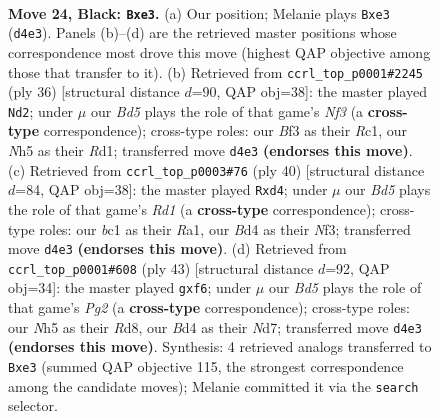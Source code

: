 \documentclass[11pt]{article}
\begin{document}
\clearpage

\begin{figure}[p]\centering
\begin{subfigure}{0.46\textwidth}\centering
\resizebox{\linewidth}{!}{%
\newchessgame
\chessboard[
  setfen={1r3r2/pp4k1/6pp/2pB3n/3bpP1P/N3RbP1/PP1P4/1RB2K2 b - - 2 24},
  showmover=false,
  pgfstyle=straightmove, color=movearrow, markmove={d4-e3}
]}
\caption{}
\end{subfigure}\hfill
\begin{subfigure}{0.46\textwidth}\centering
\resizebox{\linewidth}{!}{%
\newchessgame
\chessboard[
  setfen={5rk1/1p2bpp1/p2p1n1p/4p3/2r1P3/2P1BN2/PP3PPP/2RR2K1 w - - 0 19},
  showmover=false,
  pgfstyle=straightmove, color=movearrow, markmove={f3-d2}
]}
\caption{}
\end{subfigure}
\\[4pt]
\begin{subfigure}{0.46\textwidth}\centering
\resizebox{\linewidth}{!}{%
\newchessgame
\chessboard[
  setfen={4r1k1/1b1nb1p1/p3pr1p/8/Pp1p4/1B2BN2/1P3PPP/R2R2K1 w - - 0 21},
  showmover=false,
  pgfstyle=straightmove, color=movearrow, markmove={d1-d4}
]}
\caption{}
\end{subfigure}\hfill
\begin{subfigure}{0.46\textwidth}\centering
\resizebox{\linewidth}{!}{%
\newchessgame
\chessboard[
  setfen={3r2k1/p2nb1pp/2r1pPb1/P1p5/2N1P3/1pP1B1PB/5P1P/2RR2K1 b - - 0 22},
  showmover=false,
  pgfstyle=straightmove, color=movearrow, markmove={g7-f6}
]}
\caption{}
\end{subfigure}
\caption{\textbf{Move 24, Black: \texttt{Bxe3}.} (a) Our position; Melanie plays \texttt{Bxe3} (\texttt{d4e3}). Panels (b)--(d) are the retrieved master positions whose correspondence most drove this move (highest QAP objective among those that transfer to it). (b) Retrieved from \texttt{ccrl\_top\_p0001\#2245} (ply 36) [structural distance $d$=90, QAP obj=38]: the master played \texttt{Nd2}; under $\mu$ our \emph{Bd5} plays the role of that game's \emph{Nf3} (a \textbf{cross-type} correspondence); cross-type roles: our \emph{B}f3 as their \emph{R}c1, our \emph{N}h5 as their \emph{R}d1; transferred move \texttt{d4e3} \textbf{(endorses this move)}. (c) Retrieved from \texttt{ccrl\_top\_p0003\#76} (ply 40) [structural distance $d$=84, QAP obj=38]: the master played \texttt{Rxd4}; under $\mu$ our \emph{Bd5} plays the role of that game's \emph{Rd1} (a \textbf{cross-type} correspondence); cross-type roles: our \emph{b}c1 as their \emph{R}a1, our \emph{B}d4 as their \emph{N}f3; transferred move \texttt{d4e3} \textbf{(endorses this move)}. (d) Retrieved from \texttt{ccrl\_top\_p0001\#608} (ply 43) [structural distance $d$=92, QAP obj=34]: the master played \texttt{gxf6}; under $\mu$ our \emph{Bd5} plays the role of that game's \emph{Pg2} (a \textbf{cross-type} correspondence); cross-type roles: our \emph{N}h5 as their \emph{R}d8, our \emph{B}d4 as their \emph{N}d7; transferred move \texttt{d4e3} \textbf{(endorses this move)}. Synthesis: 4 retrieved analogs transferred to \texttt{Bxe3} (summed QAP objective 115, the strongest correspondence among the candidate moves); Melanie committed it via the \texttt{search} selector.}
\label{fig:thought-m47}
\end{figure}
\end{document}
